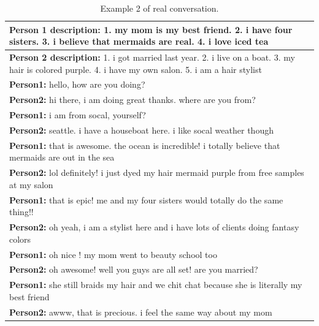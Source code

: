\begin{table}[ht]
\centering
 \begin{tabular}{|p{14cm}|} 
 \hline\hline
 \textbf{Person 1 description:} 1. my mom is my best friend. 2. i have four sisters. 3. i believe that mermaids are real. 4. i love iced tea \\
 \hline
 \textbf{Person 2 description:} 1. i got married last year. 2. i live on a boat. 3. my hair is colored purple. 4. i have my own salon. 5. i am a hair stylist \\
 \hline\hline
 \textbf{Person1:} hello, how are you doing? \\
 \textbf{Person2:} hi there, i am doing great thanks. where are you from?\\ 
 \textbf{Person1:} i am from socal, yourself? \\
 \textbf{Person2:} seattle. i have a houseboat here. i like socal weather though\\
 \textbf{Person1:} that is awesome. the ocean is incredible! i totally believe that mermaids are out in the sea \\
 \textbf{Person2:} lol definitely! i just dyed my hair mermaid purple from free samples at my salon \\
 \textbf{Person1:} that is epic! me and my four sisters would totally do the same thing!! \\
 \textbf{Person2:} oh yeah, i am a stylist here and i have lots of clients doing fantasy colors \\
 \textbf{Person1:} oh nice ! my mom went to beauty school too \\
 \textbf{Person2:} oh awesome! well you guys are all set! are you married? \\
 \textbf{Person1:} she still braids my hair and we chit chat because she is literally my best friend \\
 \textbf{Person2:} awww, that is precious. i feel the same way about my mom \\
 \hline\hline
 \end{tabular}
 \caption{Example 2 of real conversation.}
\label{tab:real_conversation_2_ap}
\end{table}

